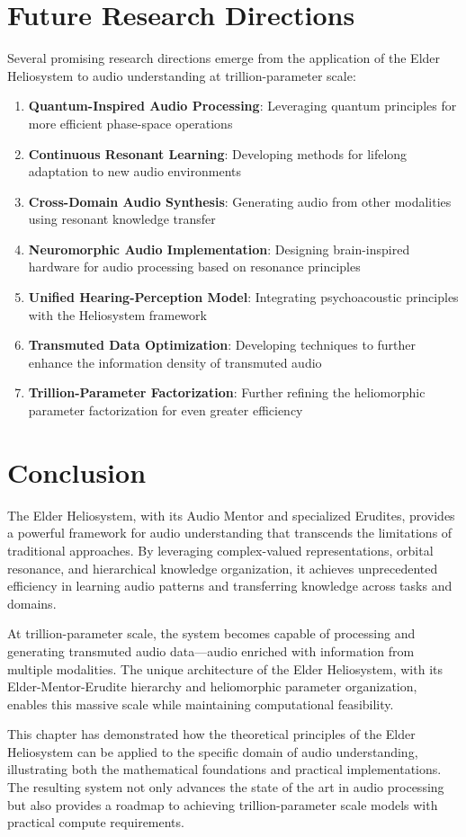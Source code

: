 \section{Future Research Directions}

Several promising research directions emerge from the application of the Elder Heliosystem to audio understanding at trillion-parameter scale:

\begin{enumerate}
    \item \textbf{Quantum-Inspired Audio Processing}: Leveraging quantum principles for more efficient phase-space operations
    \item \textbf{Continuous Resonant Learning}: Developing methods for lifelong adaptation to new audio environments
    \item \textbf{Cross-Domain Audio Synthesis}: Generating audio from other modalities using resonant knowledge transfer
    \item \textbf{Neuromorphic Audio Implementation}: Designing brain-inspired hardware for audio processing based on resonance principles
    \item \textbf{Unified Hearing-Perception Model}: Integrating psychoacoustic principles with the Heliosystem framework
    \item \textbf{Transmuted Data Optimization}: Developing techniques to further enhance the information density of transmuted audio
    \item \textbf{Trillion-Parameter Factorization}: Further refining the heliomorphic parameter factorization for even greater efficiency
\end{enumerate}

\section{Conclusion}

The Elder Heliosystem, with its Audio Mentor and specialized Erudites, provides a powerful framework for audio understanding that transcends the limitations of traditional approaches. By leveraging complex-valued representations, orbital resonance, and hierarchical knowledge organization, it achieves unprecedented efficiency in learning audio patterns and transferring knowledge across tasks and domains.

At trillion-parameter scale, the system becomes capable of processing and generating transmuted audio data—audio enriched with information from multiple modalities. The unique architecture of the Elder Heliosystem, with its Elder-Mentor-Erudite hierarchy and heliomorphic parameter organization, enables this massive scale while maintaining computational feasibility.

This chapter has demonstrated how the theoretical principles of the Elder Heliosystem can be applied to the specific domain of audio understanding, illustrating both the mathematical foundations and practical implementations. The resulting system not only advances the state of the art in audio processing but also provides a roadmap to achieving trillion-parameter scale models with practical compute requirements.
